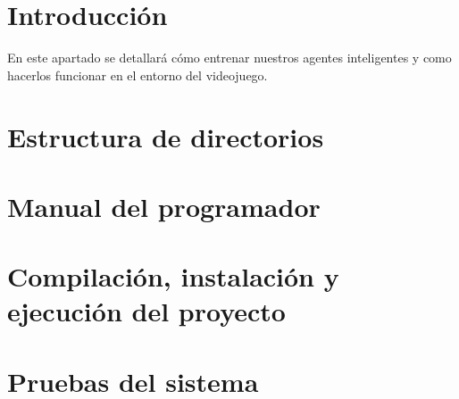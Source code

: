 
\section{Introducción}
En este apartado se detallará cómo entrenar nuestros agentes inteligentes y como hacerlos funcionar en el entorno del videojuego. 

\section{Estructura de directorios}

\section{Manual del programador}

\section{Compilación, instalación y ejecución del proyecto}

\section{Pruebas del sistema}
